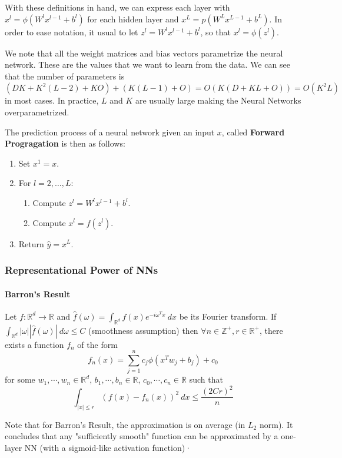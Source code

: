 \documentclass{article}
\newcommand{\R}{\mathbb{R}}
\newcommand{\Z}{\mathbb{Z}}
\begin{document}
With these definitions in hand, we can express each layer with $x^l = \phi(W^l x^{l-1} + b^l)$ for each hidden layer and $x^L = p(W^L x^{L-1} + b^L)$.
In order to ease notation, it usual to let $z^l = W^l x^{l-1} + b^l$, so that $x^l = \phi(z^l)$.

We note that all the weight matrices and bias vectors parametrize the neural network.
These are the values that we want to learn from the data.
We can see that the number of parameters is $(DK + K^2(L-2) + KO) + (K(L-1) + O) = O(K(D + KL + O)) = O(K^2L)$ in most cases.
In practice, $L$ and $K$ are usually large making the Neural Networks overparametrized.

The prediction process of a neural network given an input $x$, called \textbf{Forward Progragation} is then as follows:
\begin{enumerate}
    \item Set $x^1 = x$.
    \item For $l = 2, \dots, L$:
    \begin{enumerate}
	\item Compute $z^l = W^l x^{l-1} + b^l$.
	\item Compute $x^l = f(z^l)$.
    \end{enumerate}
    \item Return $\hat{y} = x^L$.
\end{enumerate}

\subsubsection{Representational Power of NNs}

\paragraph{Barron's Result}

Let $f : \R^d \to \R$ and $\hat{f}(\omega) = \int_{\R^d} f(x) e^{-i\omega^Tx} \ dx$ be its Fourier transform.
If $\int_{\R^d} |\omega| |\hat{f}(\omega)| \ d \omega \leq C$ (smoothness assumption) then $\forall n \in \Z^+, r \in \R^+$, there exists a function $f_n$ of the form
$$
f_n(x) = \sum_{j=1}^n c_j \phi(x^T w_j + b_j) + c_0
$$
for some $w_1, \cdots, w_n \in \R^d$, $b_1, \cdots, b_n \in \R$, $c_0, \cdots, c_n \in \R$ such that
$$
\int_{|x| \leq r} (f(x) - f_n(x))^2 \ dx \leq \frac{(2Cr)^2}{n}
$$

Note that for Barron's Result, the approximation is on average (in $L_2$ norm).
It concludes that any "sufficiently smooth" function can be approximated by a one-layer NN (with a sigmoid-like activation function)·
\end{document}
